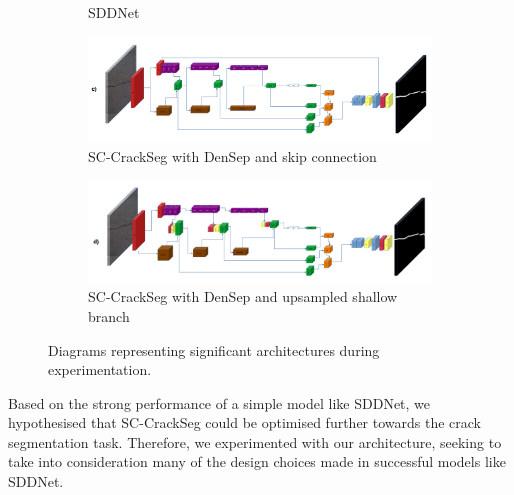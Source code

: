 \documentclass[a4paper,12pt]{report}
\begin{document}
\begin{figure}[]
\begin{subfigure}[b]{0.6964\textwidth}
        \caption{SDDNet}
        \label{fig:sc-crackseg-versions-sddnet}
    \end{subfigure}
    \begin{subfigure}[b]{0.6964\textwidth}
        \centering
        \includegraphics[width=\textwidth]{res/crack-experiment-diagrams/sc-crackseg-densep-skip.pdf}
        \caption{SC-CrackSeg with DenSep and skip connection}
        \label{fig:sc-crackseg-versions-sc-crackseg-densep-skip}
    \end{subfigure}
    \begin{subfigure}[b]{0.6964\textwidth}
        \centering
        \includegraphics[width=\textwidth]{res/crack-experiment-diagrams/sc-crackseg-densep-upsample.pdf}
        \caption{SC-CrackSeg with DenSep and upsampled shallow branch}
        \label{fig:sc-crackseg-versions-sc-crackseg-densep-upsample}
    \end{subfigure}

    \caption{Diagrams representing significant architectures during experimentation.}
    \label{fig:sc-crackseg-versions}
\end{figure}

Based on the strong performance of a simple model like SDDNet, we hypothesised that SC-CrackSeg could be optimised further towards the crack segmentation task. Therefore, we experimented with our architecture, seeking to take into consideration many of the design choices made in successful models like SDDNet.
\end{document}
